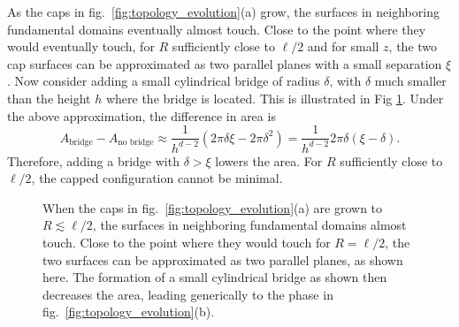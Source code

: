 \documentclass[11 pt]{article}
\begin{document}
As the caps in fig.~\ref{fig:topology_evolution}(a) grow, the surfaces in neighboring fundamental domains eventually almost touch. Close to the point where they would eventually touch, for $R$ sufficiently close to $\ell/2$ and for small $z$, the two cap surfaces can be approximated as two parallel planes with a small separation $\xi$. 
Now consider adding a small cylindrical bridge of radius $\delta$, with $\delta$ much smaller than the height $h$ where the bridge is located. 
This is illustrated in Fig \ref{fig:bridge_argument}. 
Under the above approximation, the difference in area is
$$A_\text{bridge} - A_\text{no bridge}\approx\frac{1}{h^{d-2}}(2\pi\delta\xi - 2\pi\delta^2)=\frac{1}{h^{d-2}}2\pi\delta(\xi-\delta).$$
Therefore, adding a bridge with $\delta>\xi$ lowers the area. For $R$ sufficiently close to $\ell/2$, the capped configuration cannot be minimal.


\begin{figure}
    \centering
    \caption{When the caps in fig.~\ref{fig:topology_evolution}(a) are grown to $R\lesssim \ell/2$, the surfaces in neighboring fundamental domains almost touch. Close to the point where they would touch for $R=\ell/2$, the two surfaces can be approximated as two parallel planes, as shown here. The formation of a small cylindrical bridge as shown then decreases the area, leading generically to the phase in fig.~\ref{fig:topology_evolution}(b).\label{fig:bridge_argument}}
\end{figure}
\end{document}
